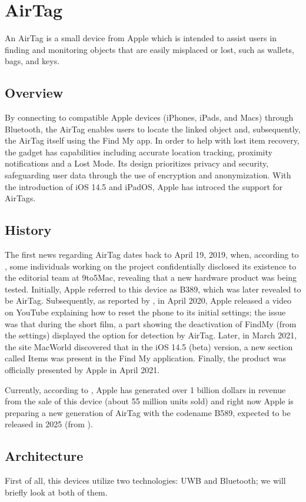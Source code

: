 \documentclass[english]{article}
\begin{document}
\section{AirTag}\label{sec:at}
An AirTag is a small device from Apple which is intended to assist users in finding and monitoring objects that are easily misplaced or lost, such as wallets, bags, and keys.
\subsection{Overview}
 By connecting to compatible Apple devices (iPhones, iPads, and Macs) through Bluetooth, the AirTag enables users to locate the linked object and, subsequently, the AirTag itself using the Find My app. In order to help with lost item recovery, the gadget has capabilities including accurate location tracking, proximity notifications and a Lost Mode. Its design prioritizes privacy and security, safeguarding user data through the use of encryption and anonymization. With the introduction of iOS 14.5 and iPadOS, Apple has introced the support for AirTags.
\subsection{History}
The first news regarding AirTag dates back to April 19, 2019, when, according to \cite{Rambo_2019}, some individuals working on the project confidentially disclosed its existence to the editorial team at 9to5Mac, revealing that a new hardware product was being tested. Initially, Apple referred to this device as B389, which was later revealed to be AirTag. Subsequently, as reported by \cite{TechCrunch}, in April 2020, Apple released a video on YouTube explaining how to reset the phone to its initial settings; the issue was that during the short film, a part showing the deactivation of FindMy (from the settings) displayed the option for detection by AirTag. Later, in March 2021, the site MacWorld \cite{Macworld} discovered that in the iOS 14.5 (beta) version, a new section called Items was present in the Find My application. Finally, the product was officially presented by Apple in April 2021. 

Currently, according to \cite{Kumar_2023}, Apple has generated over 1 billion dollars in revenue from the sale of this device (about 55 million units sold) and right now Apple is preparing a new generation of AirTag with the codename B589, expected to be released in 2025 (from \cite{Bloomberg}).

\subsection{Architecture}
First of all, this devices utilize two technologies: UWB and Bluetooth; we will briefly look at both of them.
\end{document}
